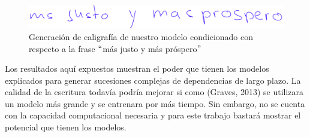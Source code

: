 \begin{figure}[h]
\begin{center}
\includegraphics[width=150mm, scale = 0.8]{./imag/mas_justo.png}
\end{center}
\caption{Generación de caligrafía de nuestro modelo condicionado con respecto a la frase $``$más justo y más próspero$"$}
\end{figure}

\vspace{1em}

Los resultados aquí expuestos muestran el poder que tienen los modelos explicados para generar sucesiones complejas de dependencias de largo plazo. La calidad de la escritura todavía podría mejorar si como (Graves, 2013) se utilizara un modelo más grande y se entrenara por más tiempo. Sin embargo, no se cuenta con la capacidad computacional necesaria y para este trabajo bastará mostrar el potencial que tienen los modelos.
\cite{DBLP:journals/corr/Graves13}